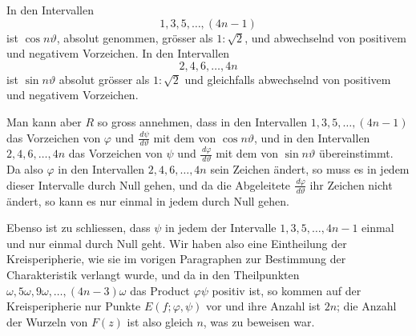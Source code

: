 \documentclass[11pt]{article}
\providecommand{\dd}{\,d}
\begin{document}
In den Intervallen
\[
        1,3,5,\ldots,(4n-1)
\]
ist $\cos n\vartheta$, absolut genommen, grösser als $1:\sqrt2$, und abwechselnd von positivem und negativem Vorzeichen. In den Intervallen
\[
        2,4,6,\ldots,4n
\]
ist $\sin n\vartheta$ absolut grösser als $1:\sqrt2$ und gleichfalls abwechselnd von positivem und negativem Vorzeichen.

Man kann aber $R$ so gross annehmen, dass in den Intervallen $1,3,5,\ldots,(4n-1)$ das Vorzeichen von $\varphi$ und $\frac{\dd\psi}{\dd\vartheta}$ mit dem von $\cos n\vartheta$, und in den Intervallen $2,4,6,\ldots,4n$ das Vorzeichen von $\psi$ und $\frac{\dd\varphi}{\dd\vartheta}$ mit dem von $\sin n\vartheta$ übereinstimmt. Da also $\varphi$ in den Intervallen $2,4,6,\ldots,4n$ sein Zeichen ändert, so muss es in jedem dieser Intervalle durch Null gehen, und da die Abgeleitete $\frac{\dd\varphi}{\dd\vartheta}$ ihr Zeichen nicht ändert, so kann es nur einmal in jedem durch Null gehen.

Ebenso ist zu schliessen, dass $\psi$ in jedem der Intervalle $1,3,5,\ldots,4n-1$ einmal und nur einmal durch Null geht. Wir haben also eine Eintheilung der Kreisperipherie, wie sie im vorigen Paragraphen zur Bestimmung der Charakteristik verlangt wurde, und da in den Theilpunkten $\omega,5\omega,9\omega,\ldots,(4n-3)\omega$ das Product $\varphi\psi$ positiv ist, so kommen auf der Kreisperipherie nur Punkte $E(f;\varphi,\psi)$ vor und ihre Anzahl ist $2n$; die Anzahl der Wurzeln von $F(z)$ ist also gleich $n$, was zu beweisen war.
\end{document}
